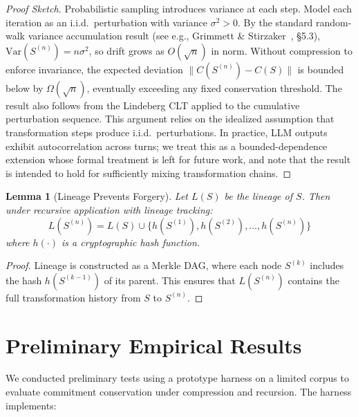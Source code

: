\documentclass[11pt,a4paper]{article}
\newtheorem{lemma}[theorem]{Lemma}
\begin{document}
\begin{proof}[Proof Sketch]
Probabilistic sampling introduces variance at each step. Model each iteration as an i.i.d.\ perturbation with variance $\sigma^2 > 0$. By the standard random-walk variance accumulation result (see e.g., Grimmett \& Stirzaker~\cite{grimmett2001}, \S5.3), $\mathrm{Var}(S^{(n)}) = n\sigma^2$, so drift grows as $O(\sqrt{n})$ in norm. Without compression to enforce invariance, the expected deviation $\| C(S^{(n)}) - C(S) \|$ is bounded below by $\Omega(\sqrt{n})$, eventually exceeding any fixed conservation threshold. The result also follows from the Lindeberg CLT applied to the cumulative perturbation sequence. This argument relies on the idealized assumption that transformation steps produce i.i.d.\ perturbations. In practice, LLM outputs exhibit autocorrelation across turns; we treat this as a bounded-dependence extension whose formal treatment is left for future work, and note that the result is intended to hold for sufficiently mixing transformation chains.
\end{proof}

\begin{lemma}[Lineage Prevents Forgery]
\label{lem:lineage}
Let $L(S)$ be the lineage of $S$. Then under recursive application with lineage tracking:
\begin{equation}
L(S^{(n)}) = L(S) \cup \{h(S^{(1)}), h(S^{(2)}), \ldots, h(S^{(n)})\}
\end{equation}
where $h(\cdot)$ is a cryptographic hash function.
\end{lemma}

\begin{proof}
Lineage is constructed as a Merkle DAG, where each node $S^{(k)}$ includes the hash $h(S^{(k-1)})$ of its parent. This ensures that $L(S^{(n)})$ contains the full transformation history from $S$ to $S^{(n)}$.
\end{proof}

\section{Preliminary Empirical Results}
\label{sec:empirical}

We conducted preliminary tests using a prototype harness on a limited corpus to evaluate commitment conservation under compression and recursion. The harness implements:
\end{document}
